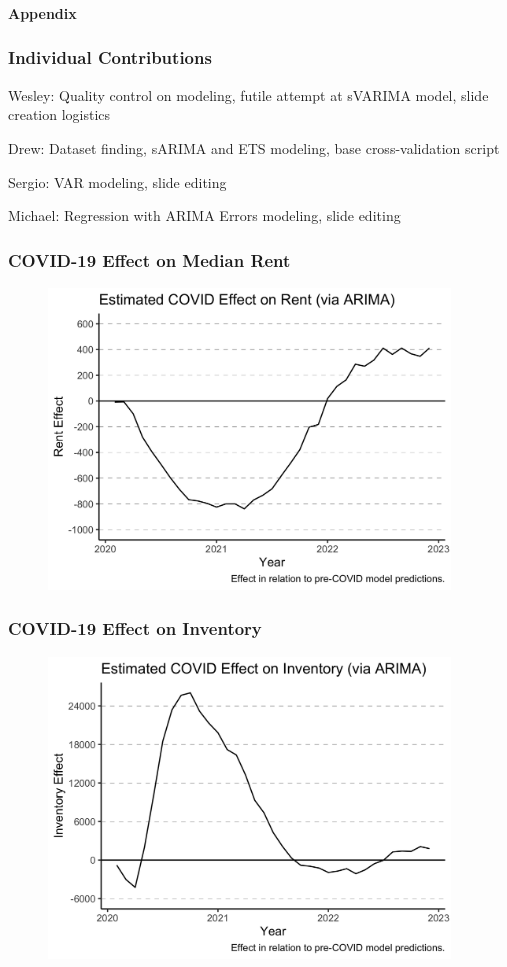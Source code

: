 \documentclass[t]{beamer}
\let\tempone\itemize
\let\temptwo\enditemize
\renewenvironment{itemize}{\tempone\addtolength{\itemsep}{0.5\baselineskip}}{\temptwo}
\begin{document}
\begin{frame}
\frametitle{}
\Large{\textbf{Appendix}}
\end{frame}

\begin{frame}
\frametitle{Individual Contributions}
\begin{itemize}
\doublespacing
\item Wesley: Quality control on modeling, futile attempt at sVARIMA model, slide creation logistics

\item Drew: Dataset finding, sARIMA and ETS modeling, base cross-validation script

\item Sergio: VAR modeling, slide editing

\item Michael: Regression with ARIMA Errors modeling, slide editing
\end{itemize}
\end{frame}

\begin{frame}
\frametitle{COVID-19 Effect on Median Rent}
\begin{figure}
\includegraphics[width=4.2in]{rent_covid_effect.png}
\end{figure}
\end{frame}

\begin{frame}
\frametitle{COVID-19 Effect on Inventory}
\begin{figure}
\includegraphics[width=4.2in]{inventory_covid_effect.png}
\end{figure}
\end{frame}
\end{document}
